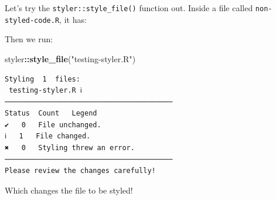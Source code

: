 \documentclass[]{Nemilov}
\newenvironment{Shaded}{\begin{snugshade}}{\end{snugshade}}
\newcommand{\CommentTok}[1]{\textcolor[rgb]{0.56,0.35,0.01}{\textit{#1}}}
\newcommand{\ControlFlowTok}[1]{\textcolor[rgb]{0.13,0.29,0.53}{\textbf{#1}}}
\newcommand{\DataTypeTok}[1]{\textcolor[rgb]{0.13,0.29,0.53}{#1}}
\newcommand{\DecValTok}[1]{\textcolor[rgb]{0.00,0.00,0.81}{#1}}
\newcommand{\KeywordTok}[1]{\textcolor[rgb]{0.13,0.29,0.53}{\textbf{#1}}}
\newcommand{\NormalTok}[1]{#1}
\newcommand{\OperatorTok}[1]{\textcolor[rgb]{0.81,0.36,0.00}{\textbf{#1}}}
\newcommand{\OtherTok}[1]{\textcolor[rgb]{0.56,0.35,0.01}{#1}}
\newcommand{\StringTok}[1]{\textcolor[rgb]{0.31,0.60,0.02}{#1}}
\begin{document}
Let's try the \texttt{styler::style\_file()} function out. Inside a file called
\texttt{non-styled-code.R}, it has:

\begin{Shaded}
\end{Shaded}

Then we run:

\begin{Shaded}
\begin{Highlighting}[]
\NormalTok{styler}\OperatorTok{::}\KeywordTok{style_file}\NormalTok{(}\StringTok{"testing-styler.R"}\NormalTok{)}
\end{Highlighting}
\end{Shaded}

\begin{verbatim}
Styling  1  files:
 testing-styler.R ℹ
────────────────────────────────────────
Status  Count   Legend
✔   0   File unchanged.
ℹ   1   File changed.
✖   0   Styling threw an error.
────────────────────────────────────────
Please review the changes carefully!
\end{verbatim}

Which changes the file to be styled!

\begin{Shaded}
\end{Shaded}
\end{document}
